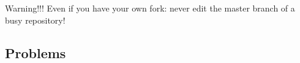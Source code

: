\begin{frame}
  \begin{alertblock}{Warning!!!}
    Even if you have your own fork: never edit the master branch of a
    busy repository!
  \end{alertblock}
\end{frame}


\subsection{Problems}




